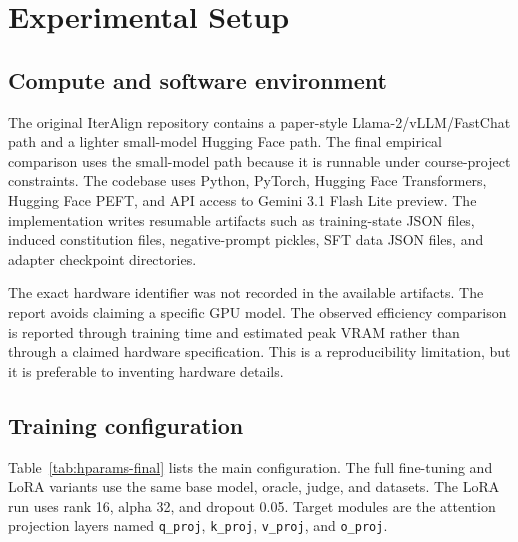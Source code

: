 \documentclass[10pt,twocolumn]{article}
\begin{document}
\section{Experimental Setup}
\label{sec:setup}

\subsection{Compute and software environment}
The original IterAlign repository contains a paper-style Llama-2/vLLM/FastChat path and a lighter small-model Hugging Face path. The final empirical comparison uses the small-model path because it is runnable under course-project constraints. The codebase uses Python, PyTorch, Hugging Face Transformers, Hugging Face PEFT, and API access to Gemini 3.1 Flash Lite preview. The implementation writes resumable artifacts such as training-state JSON files, induced constitution files, negative-prompt pickles, SFT data JSON files, and adapter checkpoint directories.

The exact hardware identifier was not recorded in the available artifacts. The report avoids claiming a specific GPU model. The observed efficiency comparison is reported through training time and estimated peak VRAM rather than through a claimed hardware specification. This is a reproducibility limitation, but it is preferable to inventing hardware details.

\subsection{Training configuration}
Table~\ref{tab:hparams-final} lists the main configuration. The full fine-tuning and LoRA variants use the same base model, oracle, judge, and datasets. The LoRA run uses rank 16, alpha 32, and dropout 0.05. Target modules are the attention projection layers named \texttt{q\_proj}, \texttt{k\_proj}, \texttt{v\_proj}, and \texttt{o\_proj}.
\end{document}
